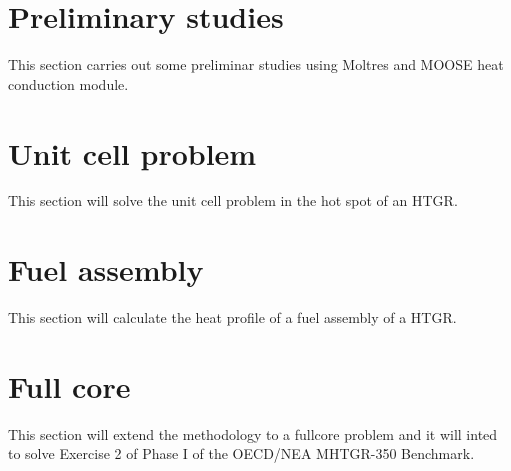 \section{Preliminary studies}

This section carries out some preliminar studies using Moltres and MOOSE heat conduction module.

\section{Unit cell problem}

This section will solve the unit cell problem in the hot spot of an HTGR.

\section{Fuel assembly}

This section will calculate the heat profile of a fuel assembly of a HTGR.

\section{Full core}

This section will extend the methodology to a fullcore problem and it will inted to solve Exercise 2 of Phase I of the OECD/NEA MHTGR-350 Benchmark.